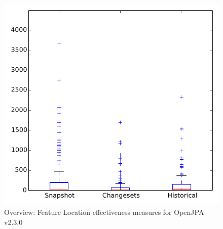 
\begin{figure}
\centering
\includegraphics[height=0.4\textheight]{figures/flt/all_openjpa}
\caption{Overview: Feature Location effectiveness measures for OpenJPA v2.3.0}
\label{fig:flt:all:openjpa}
\end{figure}
